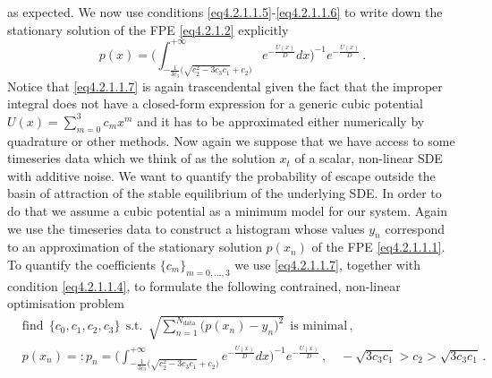\documentclass[../main.tex]{subfiles}
\begin{document}
as expected.
We now use conditions \eqref{eq4.2.1.1.5}-\eqref{eq4.2.1.1.6} to write down the stationary solution of the FPE \eqref{eq4.2.1.2} explicitly 
\begin{equation}\label{eq4.2.1.1.7}
     p(x) = \Bigg(\int_{-\frac{1}{3c_{3}}\Big(\sqrt{c_{2}^{2}-3 c_{3}c_{1}}+c_{2}\Big)}^{+\infty}e^{-\frac{U(x)}{D}}dx\Bigg)^{-1}e^{-\frac{U(x)}{D}}\,.
\end{equation}
Notice that \eqref{eq4.2.1.1.7} is again trascendental given the fact that the improper integral does not have a closed-form expression for a generic cubic potential $U(x)=\sum_{m=0}^{3}c_{m}x^{m}$ and it has to be approximated either numerically by quadrature or other methods.
Now again we suppose that we have access to some timeseries data which we think of as the solution $x_{t}$ of a scalar, non-linear SDE with additive noise.
We want to quantify the probability of escape outside the basin of attraction of the stable equilibrium of the underlying SDE.
In order to do that we assume a cubic potential as a minimum model for our system.
Again we use the timeseries data to construct a histogram whose values $y_{n}$ correspond to an approximation of the stationary solution $p(x_{n})$ of the FPE \eqref{eq4.2.1.1.1}.
To quantify the coefficients $\{c_{m}\}_{m=0,\dots,3}$ we use \eqref{eq4.2.1.1.7}, together with condition \eqref{eq4.2.1.1.4}, to formulate the following contrained, non-linear optimisation problem
\begin{align}
     &\text{find}\;\,\{c_{0},c_{1},c_{2},c_{3}\}\;\,\text{s.t.}\;\,\sqrt{\sum_{n=1}^{N_{\text{data}}}\big(p(x_{n}) - y_{n}\big)^{2}}\;\,\text{is minimal}\,, \label{eq4.2.1.1.8} \\ 
     &p(x_{n}) =: p_{n} = \Bigg(\int_{-\frac{1}{3c_{3}}\Big(\sqrt{c_{2}^{2}-3 c_{3}c_{1}}+c_{2}\Big)}^{+\infty}e^{-\frac{U(x)}{D}}dx\Bigg)^{-1}e^{-\frac{U(x)}{D}}\,,\quad -\sqrt{3c_{3}c_{1}}>c_{2}>\sqrt{3c_{3}c_{1}}\,.\nonumber
\end{align}
\printbibliography
\end{document}
